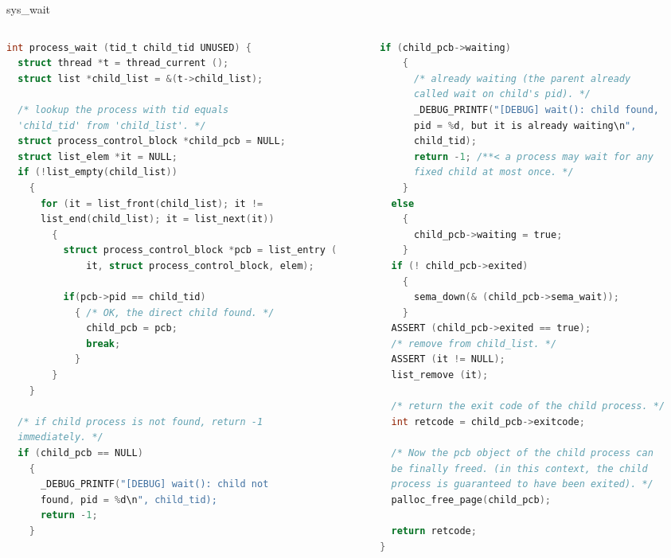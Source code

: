\documentclass[10pt]{beamer}
\begin{document}
\begin{frame}[fragile]{sys\_wait}
\begin{columns}
\begin{column}{0.5\textwidth}
\begin{lstlisting}[language=C]
int process_wait (tid_t child_tid UNUSED) {
  struct thread *t = thread_current ();
  struct list *child_list = &(t->child_list);

  /* lookup the process with tid equals
  'child_tid' from 'child_list'. */
  struct process_control_block *child_pcb = NULL;
  struct list_elem *it = NULL;
  if (!list_empty(child_list)) 
    {
      for (it = list_front(child_list); it != 
      list_end(child_list); it = list_next(it))
        {
          struct process_control_block *pcb = list_entry (
              it, struct process_control_block, elem);

          if(pcb->pid == child_tid) 
            { /* OK, the direct child found. */
              child_pcb = pcb;
              break;
            }
        }
    }

  /* if child process is not found, return -1 
  immediately. */
  if (child_pcb == NULL) 
    {
      _DEBUG_PRINTF("[DEBUG] wait(): child not
      found, pid = %d\n", child_tid);
      return -1;
    }
\end{lstlisting}
\end{column}
\begin{column}{0.5\textwidth}
\begin{lstlisting}[language=C]
if (child_pcb->waiting) 
    {
      /* already waiting (the parent already 
      called wait on child's pid). */
      _DEBUG_PRINTF("[DEBUG] wait(): child found, 
      pid = %d, but it is already waiting\n", 
      child_tid);
      return -1; /**< a process may wait for any
      fixed child at most once. */
    }
  else 
    {
      child_pcb->waiting = true;
    }
  if (! child_pcb->exited) 
    {
      sema_down(& (child_pcb->sema_wait));
    }
  ASSERT (child_pcb->exited == true);
  /* remove from child_list. */
  ASSERT (it != NULL);
  list_remove (it);

  /* return the exit code of the child process. */
  int retcode = child_pcb->exitcode;

  /* Now the pcb object of the child process can
  be finally freed. (in this context, the child
  process is guaranteed to have been exited). */
  palloc_free_page(child_pcb);

  return retcode;
}
\end{lstlisting}
\end{column}
\end{columns}
\end{frame}
\end{document}
